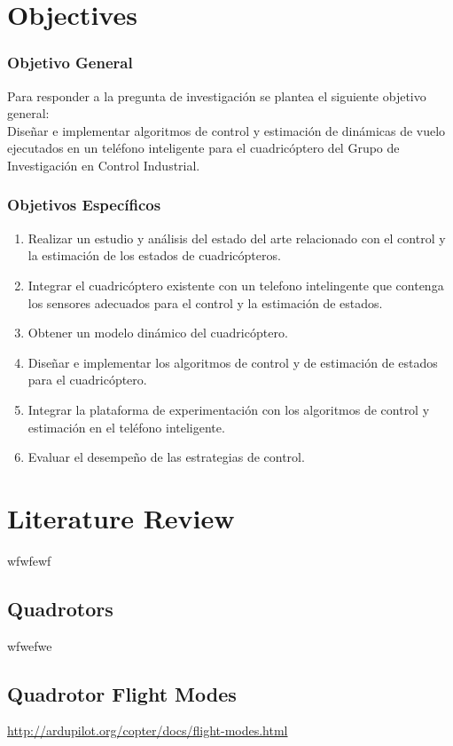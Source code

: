 \section{Objectives}
\subsubsection{Objetivo General}
Para responder a la pregunta de investigación se plantea el siguiente objetivo general:\\
Diseñar e implementar algoritmos de control y estimación de dinámicas de vuelo ejecutados en un teléfono inteligente para el cuadricóptero del Grupo de Investigación en Control Industrial.
\subsubsection{Objetivos Específicos}
\begin{enumerate}
\item Realizar un estudio y análisis del estado del arte relacionado con el control y la estimación de los estados de cuadricópteros.
\item Integrar el cuadricóptero existente con un telefono intelingente que contenga los sensores adecuados para el control y la estimación de estados.
\item Obtener un modelo dinámico del cuadricóptero.
\item Diseñar e implementar los algoritmos de control y de estimación de estados para el cuadricóptero.
\item Integrar la plataforma de experimentación con los algoritmos de control y estimación en el teléfono inteligente.
\item Evaluar el desempeño de las estrategias de control.%
\end{enumerate}

\section{Literature Review}
wfwfewf

\subsection{Quadrotors}
wfwefwe


\subsection{Quadrotor Flight Modes}
\url{http://ardupilot.org/copter/docs/flight-modes.html}
\cite{Ardupilot2016}


